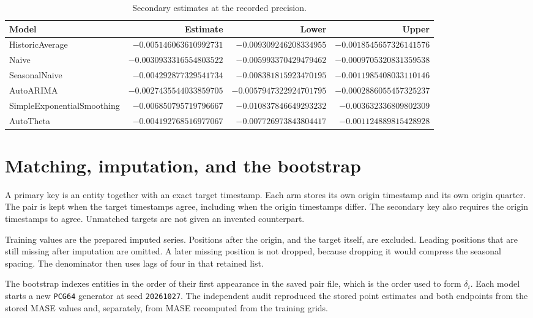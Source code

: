 \documentclass[11pt]{article}
\begin{document}
\begin{table}[ht]
\centering
\caption{Secondary estimates at the recorded precision.}
\label{tab:secondary-exact}
\scriptsize
\setlength{\tabcolsep}{4pt}
\begin{tabular}{lrrr}
\toprule
Model & Estimate & Lower & Upper \\
\midrule
HistoricAverage & $-0.005146063610992731$ & $-0.009309246208334955$ & $-0.0018545657326141576$ \\
Naive & $-0.0030933316554803522$ & $-0.005993370429479462$ & $-0.0009705320831359538$ \\
SeasonalNaive & $-0.004292877329541734$ & $-0.008381815923470195$ & $-0.0011985408033110146$ \\
AutoARIMA & $-0.0027435544033859705$ & $-0.0057947322924701795$ & $-0.0002886055457325237$ \\
SimpleExponentialSmoothing & $-0.006850795719796667$ & $-0.010837846649293232$ & $-0.003632336809802309$ \\
AutoTheta & $-0.004192768516977067$ & $-0.007726973843804417$ & $-0.001124889815428928$ \\
\bottomrule
\end{tabular}
\end{table}

\section{Matching, imputation, and the bootstrap}
\label{app:methods}

A primary key is an entity together with an exact target timestamp. Each arm stores its own origin timestamp and its own origin quarter. The pair is kept when the target timestamps agree, including when the origin timestamps differ. The secondary key also requires the origin timestamps to agree. Unmatched targets are not given an invented counterpart.

Training values are the prepared imputed series. Positions after the origin, and the target itself, are excluded. Leading positions that are still missing after imputation are omitted. A later missing position is not dropped, because dropping it would compress the seasonal spacing. The denominator then uses lags of four in that retained list.

The bootstrap indexes entities in the order of their first appearance in the saved pair file, which is the order used to form \(\delta_i\). Each model starts a new \texttt{PCG64} generator at seed \texttt{20261027}. The independent audit reproduced the stored point estimates and both endpoints from the stored MASE values and, separately, from MASE recomputed from the training grids.



\end{document}
